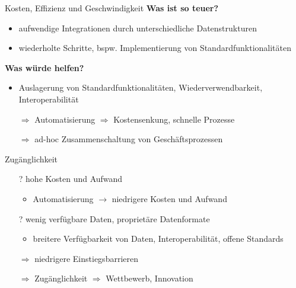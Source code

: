 \begin{frame}{Kosten, Effizienz und Geschwindigkeit}
    \textbf{Was ist so teuer?}
    \begin{itemize}
        \item aufwendige Integrationen durch unterschiedliche Datenstrukturen
        \item wiederholte Schritte, bspw. Implementierung von Standardfunktionalitäten
    \end{itemize}

    \pause
    \textbf{Was würde helfen?}
    \begin{itemize}
        \item Auslagerung von Standardfunktionalitäten, Wiederverwendbarkeit, Interoperabilität
        \item[$\Rightarrow$] Automatisierung $\Rightarrow$ Kostensenkung, schnelle Prozesse
        \item[$\Rightarrow$] ad-hoc Zusammenschaltung von Geschäftsprozessen
    \end{itemize}
\end{frame}


\begin{frame}{Zugänglichkeit}
    \begin{itemize}

        \item[?] hohe Kosten und Aufwand
        \pause
        \begin{itemize}
            \item Automatisierung $\to$ niedrigere Kosten und Aufwand
        \end{itemize}

        \pause
        \item[?] wenig verfügbare Daten, proprietäre Datenformate
        \pause
        \begin{itemize}
            \item breitere Verfügbarkeit von Daten, Interoperabilität, offene Standards
        \end{itemize}
    \end{itemize}

    \pause
    \begin{itemize}
        \item[$\Rightarrow$] niedrigere Einstiegsbarrieren
        \item[$\Rightarrow$] Zugänglichkeit $\Rightarrow$ Wettbewerb, Innovation
    \end{itemize}
\end{frame}


